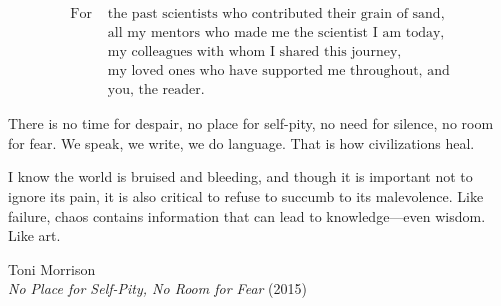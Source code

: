 \newpage
    \thispagestyle{empty}
    \vspace*{\fill}
    \begin{center}
\begin{minipage}{0.7\textwidth}
\noindent
\textit{
\begin{align*}
\text{For } & \text{the past scientists who contributed their grain of sand,} \\
& \text{all my mentors who made me the scientist I am today,} \\
& \text{my colleagues with whom I shared this journey,} \\
& \text{my loved ones who have supported me throughout, and}\\
& \text{you, the reader.}
\end{align*}
}
\end{minipage}
\end{center}
    \vspace*{\fill}


\cleardoublepage
\begin{center}
    \thispagestyle{empty}
    \vspace*{\fill}
\epigraph{There is no time for despair, no place for self-pity, no need for silence, no room for fear. We speak, we write, we do language. That is how civilizations heal.\par\medskip I know the world is bruised and bleeding, and though it is important not to ignore its pain, it is also critical to refuse to succumb to its malevolence. Like failure, chaos contains information that can lead to knowledge—even wisdom. Like art.}{Toni Morrison\\\emph{No Place for Self-Pity, No Room for Fear} (2015)}
    \vspace*{\fill}
\end{center}
\cleardoublepage
